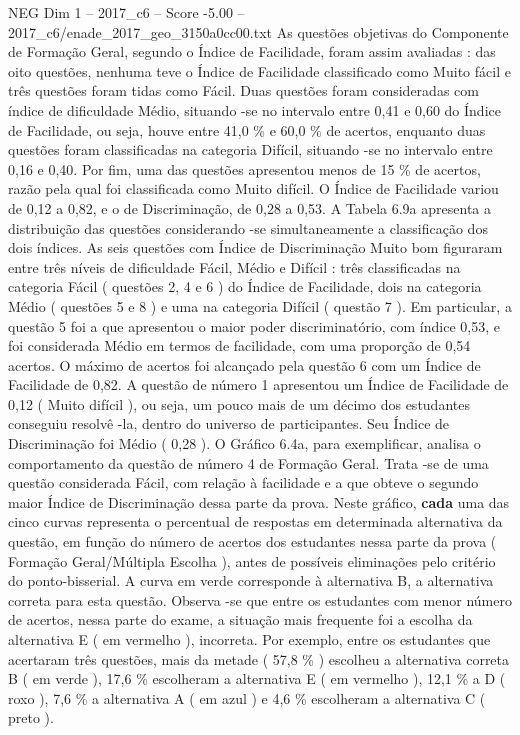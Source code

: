 \begin{textsample}{NEG Dim 1 – 2017\_c6 – Score -5.00 – 2017\_c6/enade\_2017\_geo\_3150a0cc00.txt}
As questões objetivas do Componente de Formação Geral, segundo o Índice de Facilidade, foram assim avaliadas : das oito questões, nenhuma teve o Índice de Facilidade classificado como Muito fácil e três questões foram tidas como Fácil.
Duas questões foram consideradas com índice de dificuldade Médio, situando -se no intervalo entre 0,41 e 0,60 do Índice de Facilidade, ou seja, houve entre 41,0 \% e 60,0 \% de acertos, enquanto duas questões foram classificadas na categoria Difícil, situando -se no intervalo entre 0,16 e 0,40.
Por fim, uma das questões apresentou menos de 15 \% de acertos, razão pela qual foi classificada como Muito difícil.
O Índice de Facilidade variou de 0,12 a 0,82, e o de Discriminação, de 0,28 a 0,53.
A Tabela 6.9a apresenta a distribuição das questões considerando -se simultaneamente a classificação dos dois índices.
As seis questões com Índice de Discriminação Muito bom figuraram entre três níveis de dificuldade Fácil, Médio e Difícil : três classificadas na categoria Fácil ( questões 2, 4 e 6 ) do Índice de Facilidade, dois na categoria Médio ( questões 5 e 8 ) e uma na categoria Difícil ( questão 7 ).
Em particular, a questão 5 foi a que apresentou o maior poder discriminatório, com índice 0,53, e foi considerada Médio em termos de facilidade, com uma proporção de 0,54 acertos.
O máximo de acertos foi alcançado pela questão 6 com um Índice de Facilidade de 0,82.
A questão de número 1 apresentou um Índice de Facilidade de 0,12 ( Muito difícil ), ou seja, um pouco mais de um décimo dos estudantes conseguiu resolvê -la, dentro do universo de participantes.
Seu Índice de Discriminação foi Médio ( 0,28 ).
O Gráfico 6.4a, para exemplificar, analisa o comportamento da questão de número 4 de Formação Geral.
Trata -se de uma questão considerada Fácil, com relação à facilidade e a que obteve o segundo maior Índice de Discriminação dessa parte da prova.
Neste gráfico, \textbf{cada} uma das cinco curvas representa o percentual de respostas em determinada alternativa da questão, em função do número de acertos dos estudantes nessa parte da prova ( Formação Geral/Múltipla Escolha ), antes de possíveis eliminações pelo critério do ponto-bisserial.
A curva em verde corresponde à alternativa B, a alternativa correta para esta questão.
Observa -se que entre os estudantes com menor número de acertos, nessa parte do exame, a situação mais frequente foi a escolha da alternativa E ( em vermelho ), incorreta.
Por exemplo, entre os estudantes que acertaram três questões, mais da metade ( 57,8 \% ) escolheu a alternativa correta B ( em verde ), 17,6 \% escolheram a alternativa E ( em vermelho ), 12,1 \% a D ( roxo ), 7,6 \% a alternativa A ( em azul ) e 4,6 \% escolheram a alternativa C ( preto ).

\end{textsample}
